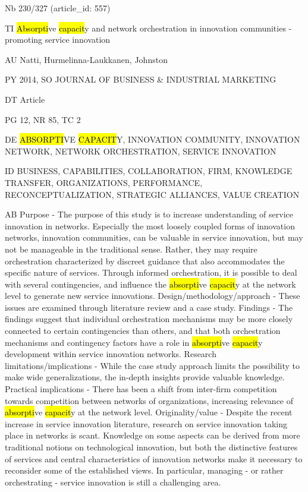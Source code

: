 \documentclass[a4paper]{article}
\begin{document}
\vspace*{-2cm}
Nb \tabto{0cm}230/327 (article\_id: 557)\par
TI \tabto{0cm}\hl{Absorpti}ve \hl{capacit}y and network orchestration in innovation communities - promoting service innovation\par
AU \tabto{0cm}Natti, Hurmelinna-Laukkanen, Johnston\par
PY \tabto{0cm}2014, SO JOURNAL OF BUSINESS \& INDUSTRIAL MARKETING\par
DT \tabto{0cm}Article\par
PG \tabto{0cm}12, NR 85, TC 2\par
DE \tabto{0cm}\hl{ABSORPTI}VE \hl{CAPACIT}Y, INNOVATION COMMUNITY, INNOVATION NETWORK, NETWORK ORCHESTRATION, SERVICE INNOVATION\par
ID \tabto{0cm}BUSINESS, CAPABILITIES, COLLABORATION, FIRM, KNOWLEDGE TRANSFER, ORGANIZATIONS, PERFORMANCE, RECONCEPTUALIZATION, STRATEGIC ALLIANCES, VALUE CREATION\par
AB \tabto{0cm}Purpose - The purpose of this study is to increase understanding of service innovation in networks. Especially the most loosely coupled forms of innovation networks, innovation communities, can be valuable in service innovation, but may not be manageable in the traditional sense. Rather, they may require orchestration characterized by discreet guidance that also accommodates the specific nature of services. Through informed orchestration, it is possible to deal with several contingencies, and influence the \hl{absorpti}ve \hl{capacit}y at the network level to generate new service innovations.
Design/methodology/approach - These issues are examined through literature review and a case study.
Findings - The findings suggest that individual orchestration mechanisms may be more closely connected to certain contingencies than others, and that both orchestration mechanisms and contingency factors have a role in \hl{absorpti}ve \hl{capacit}y development within service innovation networks.
Research limitations/implications - While the case study approach limits the possibility to make wide generalizations, the in-depth insights provide valuable knowledge.
Practical implications - There has been a shift from inter-firm competition towards competition between networks of organizations, increasing relevance of \hl{absorpti}ve \hl{capacit}y at the network level.
Originality/value - Despite the recent increase in service innovation literature, research on service innovation taking place in networks is scant. Knowledge on some aspects can be derived from more traditional notions on technological innovation, but both the distinctive features of services and central characteristics of innovation networks make it necessary to reconsider some of the established views. In particular, managing - or rather orchestrating - service innovation is still a challenging area.\par
\clearpage
\end{document}
